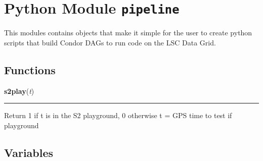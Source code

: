 %
%
%


\section{Python Module \texttt{pipeline}}

    \label{pipeline}
This modules contains objects that make it simple for the user to create 
python scripts that build Condor DAGs to run code on the LSC Data Grid.



  \subsection{Functions}

    \label{pipeline:s2play}
    \vspace{0.5ex}

    \noindent\begin{boxedminipage}{\textwidth}

    \raggedright \textbf{s2play}(\textit{t})

    \vspace{-1.5ex}

    \rule{\textwidth}{0.5\fboxrule}
    Return 1 if t is in the S2 playground, 0 otherwise t = GPS time to 
    test if playground

    \vspace{1ex}

    \end{boxedminipage}



  \subsection{Variables}


